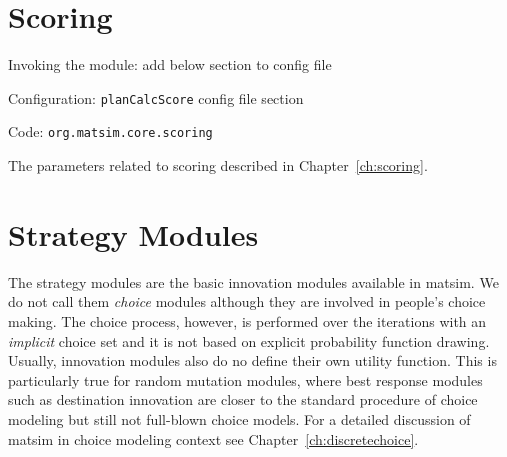 \section{Scoring}
\label{sec:scoring}
\begin{compactitem}
\item Invoking the module: add below section to config file
\item Configuration: \lstinline|planCalcScore| config file section
\item Code: \lstinline|org.matsim.core.scoring|
\end{compactitem}
%
The parameters related to scoring described in Chapter~\ref{ch:scoring}.


\section{Strategy Modules}
\label{sec:strategymodules}
The strategy modules are the basic innovation modules available in \gls{matsim}. We do not call them \emph{choice} modules although they are involved in people's choice making. The choice process, however, is performed over the iterations with an \emph{implicit} choice set and it is not based on explicit probability function drawing. Usually, innovation modules also do no define their own utility function. This is particularly true for random mutation modules, where best response modules such as destination innovation are closer to the standard procedure of choice modeling but still not full-blown choice models. For a detailed discussion of \gls{matsim} in choice modeling context see Chapter~\ref{ch:discretechoice}.

